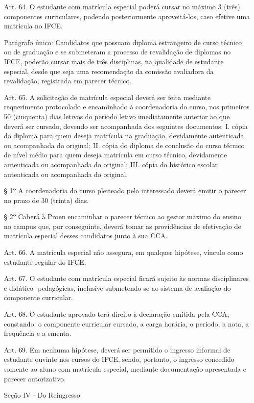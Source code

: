 \documentclass{paper}
\begin{document}
Art. 64. O estudante com matrícula especial poderá cursar no máximo 3 (três) componentes curriculares, podendo posteriormente aproveitá-los, caso efetive uma matrícula no IFCE.

Parágrafo único: Candidatos que possuam diploma estrangeiro de curso técnico ou de graduação e se submeteram a processo de revalidação de diplomas no IFCE, poderão cursar mais de três disciplinas, na qualidade de estudante especial, desde que seja uma recomendação da comissão avaliadora da revalidação, registrada em parecer técnico.

Art. 65. A solicitação de matrícula especial deverá ser feita mediante requerimento protocolado e encaminhado à coordenadoria do curso, nos primeiros 50 (cinquenta) dias letivos do período letivo imediatamente anterior ao que deverá ser cursado, devendo ser acompanhada dos seguintes documentos:
I. cópia do diploma para quem deseja matrícula na graduação, devidamente autenticada ou acompanhada do original;
II. cópia do diploma de conclusão do curso técnico de nível médio para quem deseja matrícula em curso técnico, devidamente autenticada ou acompanhada do original;
III. cópia do histórico escolar autenticada ou acompanhada do original.

§ 1º A coordenadoria do curso pleiteado pelo interessado deverá emitir o parecer no prazo de 30 (trinta) dias.

§ 2º Caberá à Proen encaminhar o parecer técnico ao gestor máximo do ensino no campus que, por conseguinte, deverá tomar as providências de efetivação de matrícula especial desses candidatos junto à sua CCA.

Art. 66. A matrícula especial não assegura, em qualquer hipótese, vínculo como estudante regular do IFCE.

Art. 67. O estudante com matrícula especial ficará sujeito às normas disciplinares e didático- pedagógicas, inclusive submetendo-se ao sistema de avaliação do componente curricular.

Art. 68. O estudante aprovado terá direito à declaração emitida pela CCA, constando: o componente curricular cursado, a carga horária, o período, a nota, a frequência e a ementa.

Art. 69. Em nenhuma hipótese, deverá ser permitido o ingresso informal de estudante ouvinte nos cursos do IFCE, sendo, portanto, o ingresso concedido somente ao aluno com matrícula especial, mediante documentação apresentada e parecer autorizativo.

\begin{center}
Seção IV - Do Reingresso
\end{center}
\end{document}
